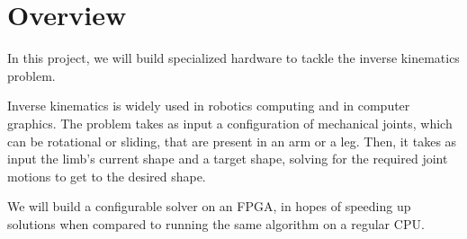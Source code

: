 \section{Overview}

In this project, we will build specialized hardware to tackle the inverse kinematics problem.

Inverse kinematics is widely used in robotics computing and in computer graphics. The problem takes as input a configuration of mechanical joints, which can be rotational or sliding, that are present in an arm or a leg. Then, it takes as input the limb's current shape and a target shape, solving for the required joint motions to get to the desired shape.

We will build a configurable solver on an FPGA, in hopes of speeding up solutions when compared to running the same algorithm on a regular CPU.